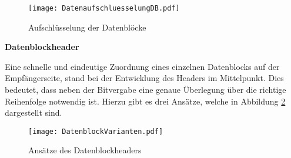 \begin{figure}[H]
	\centering
	\texttt{[image: DatenaufschluesselungDB.pdf]}
	\caption{Aufschlüsselung der Datenblöcke}
  \label{fig:DatenaufschluesselungDB}
\end{figure}

\textbf{Datenblockheader}

Eine schnelle und eindeutige Zuordnung eines einzelnen Datenblocks auf der
Empfängerseite, stand bei der Entwicklung des Headers im Mittelpunkt.
Dies bedeutet, dass neben der Bitvergabe eine genaue Überlegung über die
richtige Reihenfolge notwendig ist. Hierzu gibt es drei Ansätze, welche in
Abbildung \ref{fig:DatenblockVarianten} dargestellt sind.

\begin{figure}[H]
	\centering
	\texttt{[image: DatenblockVarianten.pdf]}
	\caption{Ansätze des Datenblockheaders}
  \label{fig:DatenblockVarianten}
\end{figure}

